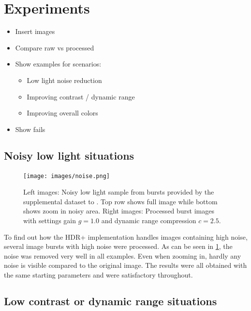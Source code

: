 \documentclass{egpubl}
\begin{document}
\section{Experiments}
\label{sec:Experiments}

\begin{itemize}
      \item Insert images
      \item Compare raw vs processed
      \item Show examples for scenarios:
      \begin{itemize}
            \item Low light noise reduction
            \item Improving contrast / dynamic range
            \item Improving overall colors
      \end{itemize}
      \item Show fails
\end{itemize} 

\subsection{Noisy low light situations}

\begin{figure}
      \hspace{\fill}
      \texttt{[image: images/noise.png]}
      \hspace{\fill}
      \centering
      \caption{
            Left images: Noisy low light sample from bursts provided by the supplemental dataset
            to \cite{Hasinoff2016burst}. Top row shows full image while bottom shows zoom in noisy
            area.
            Right images: Processed burst images with settings gain $g=1.0$ and dynamic 
            range compression $c=2.5$.
      }
      \label{fig:noise}
\end{figure}

To find out how the HDR+ implementation handles images containing high noise, several 
image bursts with high noise were processed. As can be seen in \cref{fig:noise}, the noise was 
removed very well in all examples. Even when zooming in, hardly any noise is visible 
compared to the original image.  The results were all obtained with the same starting 
parameters and were satisfactory throughout.



\subsection{Low contrast or dynamic range situations}
\end{document}

